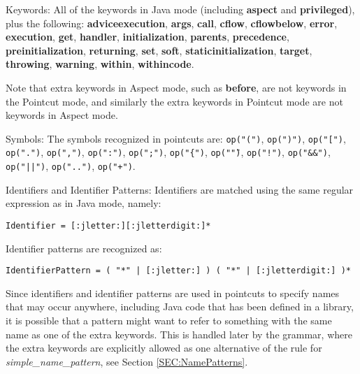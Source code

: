 \begin{description}
\item{Keywords:}
All of the keywords in {\sc Java} mode (including
{\bf aspect} and {\bf privileged}), plus the following:
{\bf adviceexecution}, {\bf args}, {\bf call}, {\bf cflow}, 
{\bf cflowbelow}, {\bf error}, {\bf execution}, {\bf get},
{\bf handler}, {\bf initialization}, {\bf parents}, {\bf precedence},
{\bf preinitialization}, {\bf returning}, {\bf set}, {\bf soft},
{\bf staticinitialization}, {\bf target}, {\bf throwing}, 
{\bf warning}, {\bf within}, {\bf withincode}.

Note that extra keywords in {\sc Aspect} mode,  such as {\bf before}, are
not keywords in the {\sc Pointcut} mode, and similarly the extra keywords
in {\sc Pointcut} mode are not keywords in {\sc Aspect} mode.    

\item{Symbols:}
The symbols recognized in pointcuts are: 
{\tt op("(")}, {\tt op(")")}, {\tt op("[")}, {\tt op(".")},
{\tt op(",")}, {\tt op(":")}, {\tt op(";")}, {\tt op("\{")},
{\tt op("\"")}, {\tt op("!")}, {\tt op("\&\&")}, {\tt op("||")},
{\tt op("..")}, {\tt op("+")}. 

\item{Identifiers and Identifier Patterns:}  Identifiers are matched
using the same regular expression as in {\sc Java} mode, namely:

{\tt Identifier = [:jletter:][:jletterdigit:]*}

\noindent
Identifier patterns are recognized as:

{\tt IdentifierPattern = ( "*" | [:jletter:] ) ( "*" | [:jletterdigit:] )*}

Since identifiers and identifier patterns are used in pointcuts to
specify names that may occur anywhere, including Java code that has
been defined in a library,  it is possible that a pattern might want
to refer to something with the same name as one of the extra keywords.
This is handled later by the grammar,  where the extra keywords are
explicitly allowed as one alternative of the rule for 
{\em simple\_name\_pattern},  see Section \ref{SEC:NamePatterns}.
\end{description}


